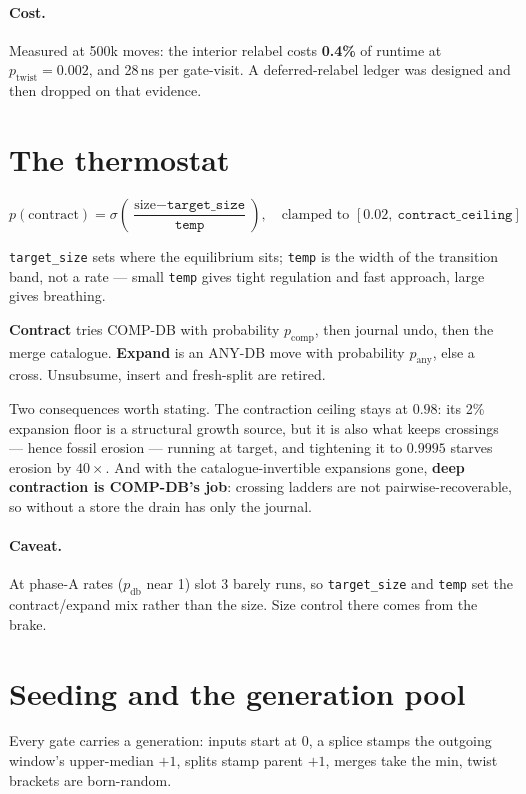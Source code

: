 \documentclass[11pt]{article}
\begin{document}
\paragraph{Cost.} Measured at 500k moves: the interior relabel costs
\textbf{0.4\%} of runtime at $p_{\text{twist}}=0.002$, and 28\,ns per
gate-visit. A deferred-relabel ledger was designed and then dropped on that
evidence.

\section{The thermostat}

\[
  p(\text{contract}) = \sigma\!\left(\frac{\text{size}-\texttt{target_size}}{\texttt{temp}}\right),
  \quad \text{clamped to } [0.02,\ \texttt{contract_ceiling}]
\]

\texttt{target_size} sets where the equilibrium sits; \texttt{temp} is the width
of the transition band, not a rate --- small \texttt{temp} gives tight regulation
and fast approach, large gives breathing.

\textbf{Contract} tries COMP-DB with probability $p_{\text{comp}}$, then journal
undo, then the merge catalogue. \textbf{Expand} is an ANY-DB move with
probability $p_{\text{any}}$, else a cross. Unsubsume, insert and fresh-split are
retired.

Two consequences worth stating. The contraction ceiling stays at $0.98$: its 2\%
expansion floor is a structural growth source, but it is also what keeps
crossings --- hence fossil erosion --- running at target, and tightening it to
$0.9995$ starves erosion by $40\times$. And with the catalogue-invertible
expansions gone, \textbf{deep contraction is COMP-DB's job}: crossing ladders are
not pairwise-recoverable, so without a store the drain has only the journal.

\paragraph{Caveat.} At phase-A rates ($p_{\text{db}}$ near 1) slot 3 barely runs,
so \texttt{target_size} and \texttt{temp} set the contract/expand mix rather than
the size. Size control there comes from the brake.

\section{Seeding and the generation pool}\label{sec:pool}

Every gate carries a generation: inputs start at 0, a splice stamps the outgoing
window's upper-median $+1$, splits stamp parent $+1$, merges take the min, twist
brackets are born-random.
\end{document}
